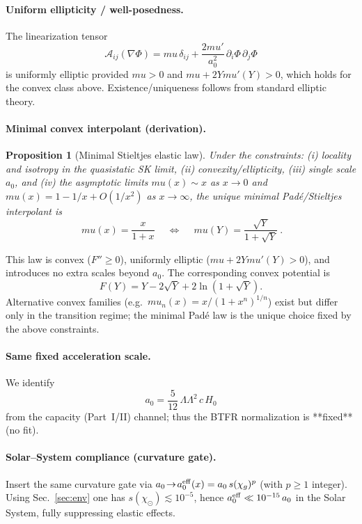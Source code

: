 \documentclass[aps,prd,onecolumn,superscriptaddress,nofootinbib]{revtex4-2}
\def\boxed#1{#1}%
\def\mu{mu}%
\def\Omega_\Lambda{OmegaLambda}%
\newtheorem{proposition}{Proposition}
\begin{document}
\paragraph{Uniform ellipticity / well-posedness.}
The linearization tensor
\[
\mathcal A_{ij}(\nabla\Phi)=\mu\,\delta_{ij}+\frac{2\mu'}{a_0^2}\,\partial_i\Phi\,\partial_j\Phi
\]
is uniformly elliptic provided \(\mu>0\) and \(\mu+2Y\mu'(Y)>0\), which holds for the convex class above. Existence/uniqueness follows from standard elliptic theory.

\paragraph{Minimal convex interpolant (derivation).}
\begin{proposition}[Minimal Stieltjes elastic law]
Under the constraints: (i) locality and isotropy in the quasistatic SK limit,
(ii) convexity/ellipticity, (iii) single scale \(a_0\), and 
(iv) the asymptotic limits
\(\mu(x)\sim x\) as \(x\to 0\) and \(\mu(x)=1-1/x+O(1/x^2)\) as \(x\to\infty\),
the unique minimal Padé/Stieltjes interpolant is
\[
\boxed{\ \mu(x)=\frac{x}{1+x}\ }\quad\Longleftrightarrow\quad
\boxed{\ \mu(Y)=\frac{\sqrt{Y}}{1+\sqrt{Y}}\ }.
\]
\end{proposition}
This law is convex (\(F''\ge0\)), uniformly elliptic (\(\mu+2Y\mu'(Y)>0\)),
and introduces no extra scales beyond \(a_0\).
The corresponding convex potential is
\[
F(Y)=Y-2\sqrt{Y}+2\ln(1+\sqrt{Y}).
\]
Alternative convex families (e.g.\ \(\mu_n(x)=x/(1+x^n)^{1/n}\))
exist but differ only in the transition regime; the minimal Padé law
is the unique choice fixed by the above constraints.
\paragraph{Same fixed acceleration scale.}
We identify
\[
\boxed{\ a_0=\frac{5}{12}\,\Omega_\Lambda^2\,c\,H_0\ }
\]
from the capacity (Part~I/II) channel; thus the BTFR normalization is **fixed** (no fit).

\paragraph{Solar–System compliance (curvature gate).}
Insert the same curvature gate via \(a_0\!\to\! a_0^{\rm eff}(x)=a_0\,s(\chi_g)^p\) (with \(p\ge1\) integer). Using Sec.~\ref{sec:env} one has \(s(\chi_\odot)\lesssim 10^{-5}\), hence \(a_0^{\rm eff}\ll 10^{-15}\,a_0\) in the Solar System, fully suppressing elastic effects.
\end{document}
